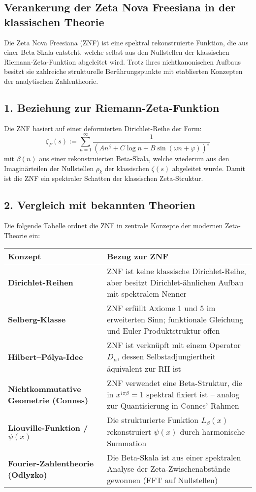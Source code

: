 \documentclass[a4paper,12pt]{article}
\begin{document}
\begin{center}
\section{Verankerung der Zeta Nova Freesiana in der klassischen Theorie}

Die Zeta Nova Freesiana (ZNF) ist eine spektral rekonstruierte Funktion, die aus einer Beta-Skala entsteht, welche selbst aus den Nullstellen der klassischen Riemann-Zeta-Funktion abgeleitet wird. Trotz ihres nichtkanonischen Aufbaus besitzt sie zahlreiche strukturelle Berührungspunkte mit etablierten Konzepten der analytischen Zahlentheorie.

\subsection*{1. Beziehung zur Riemann-Zeta-Funktion}

Die ZNF basiert auf einer deformierten Dirichlet-Reihe der Form:
\[
\zeta_F(s) := \sum_{n=1}^\infty \frac{1}{(A n^\beta + C \log n + B \sin(\omega n + \varphi))^s}
\]
mit \(\beta(n)\) aus einer rekonstruierten Beta-Skala, welche wiederum aus den Imaginärteilen der Nullstellen \(\rho_k\) der klassischen \(\zeta(s)\) abgeleitet wurde. Damit ist die ZNF ein spektraler Schatten der klassischen Zeta-Struktur.

\subsection*{2. Vergleich mit bekannten Theorien}

Die folgende Tabelle ordnet die ZNF in zentrale Konzepte der modernen Zeta-Theorie ein:

\begin{center}
\begin{tabular}{|l|p{7.5cm}|}
\hline
\textbf{Konzept} & \textbf{Bezug zur ZNF} \\
\hline
\textbf{Dirichlet-Reihen} & ZNF ist keine klassische Dirichlet-Reihe, aber besitzt Dirichlet-ähnlichen Aufbau mit spektralem Nenner \\
\hline
\textbf{Selberg-Klasse} & ZNF erfüllt Axiome 1 und 5 im erweiterten Sinn; funktionale Gleichung und Euler-Produktstruktur offen \\
\hline
\textbf{Hilbert–Pólya-Idee} & ZNF ist verknüpft mit einem Operator \( D_\mu \), dessen Selbstadjungiertheit äquivalent zur RH ist \\
\hline
\textbf{Nichtkommutative Geometrie (Connes)} & ZNF verwendet eine Beta-Struktur, die in \( x^{i \pi \beta} = 1 \) spektral fixiert ist – analog zur Quantisierung in Connes' Rahmen \\
\hline
\textbf{Liouville-Funktion / \(\psi(x)\)} & Die strukturierte Funktion \( L_\beta(x) \) rekonstruiert \(\psi(x)\) durch harmonische Summation \\
\hline
\textbf{Fourier-Zahlentheorie (Odlyzko)} & Die Beta-Skala ist aus einer spektralen Analyse der Zeta-Zwischenabstände gewonnen (FFT auf Nullstellen) \\
\hline
\end{tabular}
\end{center}


\end{center}
\end{document}
